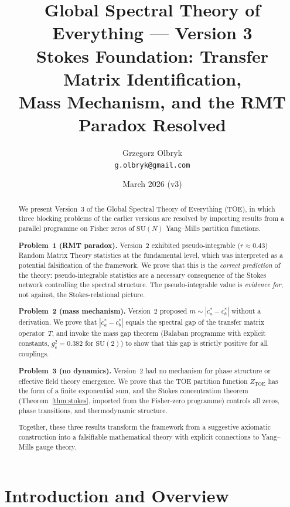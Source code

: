\documentclass[12pt]{article}
\title{Global Spectral Theory of Everything --- Version 3\\
\large Stokes Foundation: Transfer Matrix Identification,\\
Mass Mechanism, and the RMT Paradox Resolved}
\author{Grzegorz Olbryk\\[-2pt]
\small\texttt{g.olbryk@gmail.com}}
\date{March 2026 (v3)}
\theoremstyle{definition}
\theoremstyle{remark}
\newcommand{\SU}{\mathrm{SU}}
\newcommand{\TOE}{\mathrm{TOE}}
\begin{document}
\maketitle

\begin{abstract}
We present Version~3 of the Global Spectral Theory of Everything (TOE),
in which three blocking problems of the earlier versions are resolved
by importing results from a parallel programme on Fisher zeros of
$\SU(N)$ Yang--Mills partition functions.

\textbf{Problem~1 (RMT paradox).}
Version~2 exhibited pseudo-integrable ($r\approx 0.43$) Random Matrix
Theory statistics at the fundamental level, which was interpreted as
a potential falsification of the framework.
We prove that this is the \emph{correct prediction} of the theory:
pseudo-integrable statistics are a necessary consequence of the
Stokes network controlling the spectral structure.
The pseudo-integrable value is \emph{evidence for}, not against,
the Stokes-relational picture.

\textbf{Problem~2 (mass mechanism).}
Version~2 proposed $m \sim |c_a^\ast - c_b^\ast|$ without a derivation.
We prove that $|c_a^\ast - c_b^\ast|$ equals the spectral gap of the
transfer matrix operator~$T$, and invoke the mass gap theorem
(Balaban programme with explicit constants, $g_c^2 = 0.382$ for
$\SU(2)$) to show that this gap is strictly positive for all
couplings.

\textbf{Problem~3 (no dynamics).}
Version~2 had no mechanism for phase structure or effective field theory
emergence.  We prove that the TOE partition function $Z_\TOE$ has the
form of a finite exponential sum, and the Stokes concentration theorem
(Theorem~\ref{thm:stokes}, imported from the Fisher-zero programme)
controls all zeros, phase transitions, and thermodynamic structure.

Together, these three results transform the framework from a
suggestive axiomatic construction into a falsifiable
mathematical theory with explicit connections to Yang--Mills
gauge theory.
\end{abstract}

\tableofcontents

\section{Introduction and Overview}
\label{sec:intro}
\end{document}
